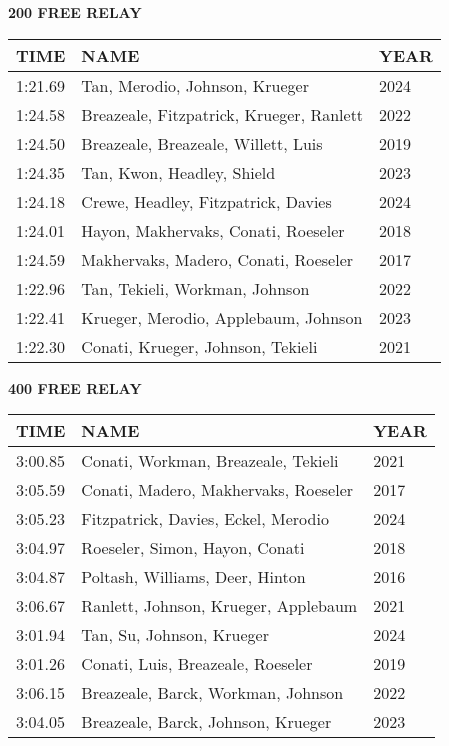\vspace{0.4cm}

\begin{center}
\begin{minipage}[t]{0.7\textwidth}
\centering
\textbf{200 FREE RELAY}\\[0.05cm]
\begin{tabular}{@{}p{1.8cm}p{2.8cm}p{1.2cm}@{}}
\hline
\textbf{TIME} & \textbf{NAME} & \textbf{YEAR} \\
\hline
1:21.69 & Tan, Merodio, Johnson, Krueger & 2024 \\
1:24.58 & Breazeale, Fitzpatrick, Krueger, Ranlett & 2022 \\
1:24.50 & Breazeale, Breazeale, Willett, Luis & 2019 \\
1:24.35 & Tan, Kwon, Headley, Shield & 2023 \\
1:24.18 & Crewe, Headley, Fitzpatrick, Davies & 2024 \\
1:24.01 & Hayon, Makhervaks, Conati, Roeseler & 2018 \\
1:24.59 & Makhervaks, Madero, Conati, Roeseler & 2017 \\
1:22.96 & Tan, Tekieli, Workman, Johnson & 2022 \\
1:22.41 & Krueger, Merodio, Applebaum, Johnson & 2023 \\
1:22.30 & Conati, Krueger, Johnson, Tekieli & 2021 \\
\hline
\end{tabular}
\end{minipage}
\end{center}

\vspace{0.4cm}

\begin{center}
\begin{minipage}[t]{0.7\textwidth}
\centering
\textbf{400 FREE RELAY}\\[0.05cm]
\begin{tabular}{@{}p{1.8cm}p{2.8cm}p{1.2cm}@{}}
\hline
\textbf{TIME} & \textbf{NAME} & \textbf{YEAR} \\
\hline
3:00.85 & Conati, Workman, Breazeale, Tekieli & 2021 \\
3:05.59 & Conati, Madero, Makhervaks, Roeseler & 2017 \\
3:05.23 & Fitzpatrick, Davies, Eckel, Merodio & 2024 \\
3:04.97 & Roeseler, Simon, Hayon, Conati & 2018 \\
3:04.87 & Poltash, Williams, Deer, Hinton & 2016 \\
3:06.67 & Ranlett, Johnson, Krueger, Applebaum & 2021 \\
3:01.94 & Tan, Su, Johnson, Krueger & 2024 \\
3:01.26 & Conati, Luis, Breazeale, Roeseler & 2019 \\
3:06.15 & Breazeale, Barck, Workman, Johnson & 2022 \\
3:04.05 & Breazeale, Barck, Johnson, Krueger & 2023 \\
\hline
\end{tabular}
\end{minipage}
\end{center}

